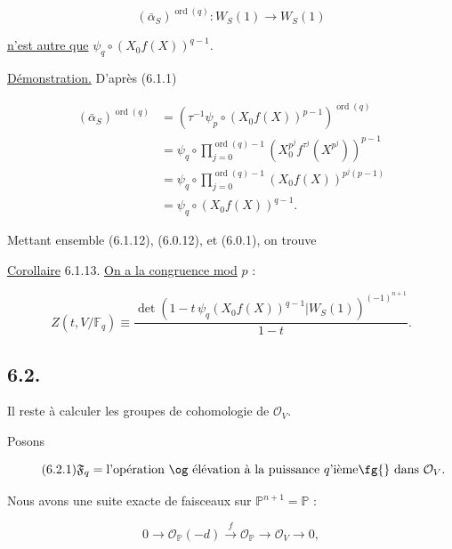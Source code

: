 \[
(\bar\alpha_S)^{\operatorname{ord}(q)}:W_S(1)\longrightarrow W_S(1)
\]

\noindent
\underline{n'est autre que} $\psi_q\circ(X_0f(X))^{q-1}$.


\underline{Démonstration.}
D'après (6.1.1)

\begin{equation*}
\begin{aligned}
(\bar\alpha_S)^{\operatorname{ord}(q)}
&=
\left(
\tau^{-1}\psi_p\circ(X_0f(X))^{p-1}
\right)^{\operatorname{ord}(q)}\\
&=
\psi_q\circ
\prod_{j=0}^{\operatorname{ord}(q)-1}
\left(X_0^{p^j}f^{\tau^j}(X^{p^j})\right)^{p-1}\\
&=
\psi_q\circ
\prod_{j=0}^{\operatorname{ord}(q)-1}
(X_0f(X))^{p^j(p-1)}\\
&=\psi_q\circ(X_0f(X))^{q-1}.
\end{aligned}
\end{equation*}

Mettant ensemble (6.1.12), (6.0.12), et (6.0.1), on trouve

\underline{Corollaire} 6.1.13.
\underline{On a la congruence mod} $p$ :

\begin{equation*}
Z(t,V/\mathbb F_q)
\equiv
\frac{
\det\!\left(
1-t\,\psi_q(X_0f(X))^{q-1}
\mathrel{\Big|}W_S(1)
\right)^{(-1)^{n+1}}
}{1-t}.
\end{equation*}

\subsection*{6.2.}
Il reste à calculer les groupes de cohomologie de $\mathcal O_V$.

Posons

\begin{equation}\tag{6.2.1}
\mathfrak F_q
=\text{l'opération \og élévation à la puissance $q$'ième\fg{} dans $\mathcal O_V$}.
\end{equation}

Nous avons une suite exacte de faisceaux sur
$\mathbb P^{n+1}=\mathbb P$ :

\begin{equation}\tag{6.2.2}
0\longrightarrow\mathcal O_{\mathbb P}(-d)
\xrightarrow{\,f\,}\mathcal O_{\mathbb P}
\longrightarrow\mathcal O_V\longrightarrow0,
\end{equation}

